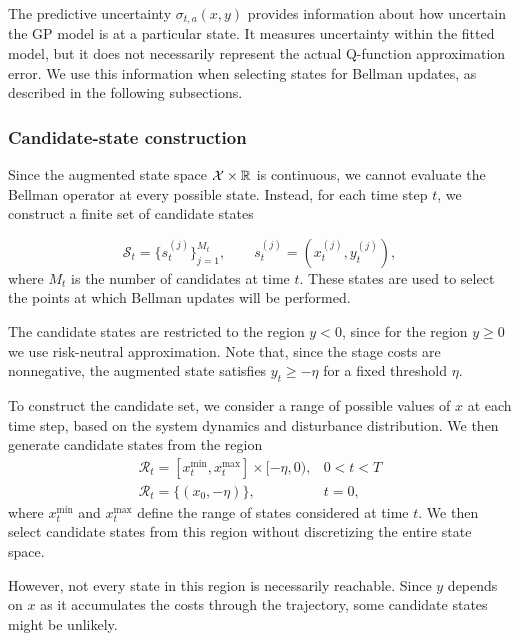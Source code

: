 The predictive uncertainty $\sigma_{t,a}(x,y)$ provides information about how uncertain the GP model is at a particular state. It measures uncertainty within the fitted model, but it does not necessarily represent the actual Q-function approximation error. We use this information when selecting states for Bellman updates, as described in the following subsections.

\subsubsection{Candidate-state construction}
\label{method:candidate}

Since the augmented state space $\mathcal{X} \times \mathbb{R}$ is continuous, we cannot evaluate the Bellman operator at every possible state. Instead, for each time step $t$, we construct a finite set of candidate states

\begin{equation}
	\mathcal{S}_t = \{s_t^{(j)}\}_{j=1}^{M_t},
	\qquad s_t^{(j)}=(x_t^{(j)},y_t^{(j)}),
	\label{candidate-set}
\end{equation}
where $M_t$ is the number of candidates at time $t$. These states are used to select the points at which Bellman updates will be performed.

The candidate states are restricted to the region $y<0$, since for the region $y\geq0$ we use risk-neutral approximation. Note that, since the stage costs are nonnegative, the augmented state satisfies $y_t\geq-\eta$ for a fixed threshold $\eta$.

To construct the candidate set, we consider a range of possible values of $x$ at each time step, based on the system dynamics and disturbance distribution. We then generate candidate states from the region
\begin{equation}
	\begin{array}{lr}
	\mathcal{R}_t =
	[x_t^{\text{min}},x_t^{\text{max}}]\times[-\eta,0), & 0 < t < T \\
	\mathcal{R}_t = \{ (x_0, -\eta) \}, & t=0,
	\end{array}
	\label{candidate-region}
\end{equation}
where $x_t^{\text{min}}$ and $x_t^{\text{max}}$ define the range of states considered at time $t$. We then select candidate states from this region without discretizing the entire state space.

However, not every state in this region is necessarily reachable. Since $y$ depends on $x$ as it accumulates the costs through the trajectory, some candidate states might be unlikely.

